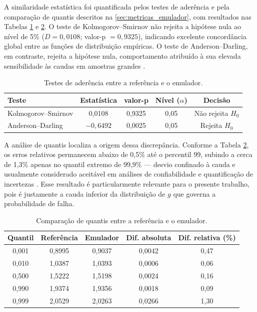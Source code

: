 A similaridade estatística foi quantificada pelos testes de aderência e pela comparação de quantis descritos na \autoref{sec:metricas_emulador}, com resultados nas Tabelas \ref{tab:statistical_tests} e \ref{tab:quantile_comparison}. O teste de Kolmogorov--Smirnov não rejeita a hipótese nula ao nível de 5\% ($D = 0{,}0108$; valor-p $= 0{,}9325$), indicando excelente concordância global entre as funções de distribuição empíricas. O teste de Anderson--Darling, em contraste, rejeita a hipótese nula, comportamento atribuído à sua elevada sensibilidade às caudas em amostras grandes \cite{scholz1987}.

\begin{table}[H]
\centering
\caption{Testes de aderência entre a referência e o emulador.}
\label{tab:statistical_tests}
\begin{tabular}{lcccc}
\toprule
\textbf{Teste} & \textbf{Estatística} & \textbf{valor-p} & \textbf{Nível ($\alpha$)} & \textbf{Decisão} \\
\midrule
Kolmogorov--Smirnov & 0,0108      & 0,9325 & 0,05 & Não rejeita $H_0$ \\
Anderson--Darling   & $-0{,}6492$ & 0,0025 & 0,05 & Rejeita $H_0$ \\
\bottomrule
\end{tabular}
\vspace{0.2cm}
\end{table}

A análise de quantis localiza a origem dessa discrepância. Conforme a Tabela \ref{tab:quantile_comparison}, os erros relativos permanecem abaixo de 0,5\% até o percentil 99, subindo a cerca de 1,3\% apenas no quantil extremo de 99,9\% --- desvio confinado à cauda e usualmente considerado aceitável em análises de confiabilidade e quantificação de incertezas \cite{sudret2008}. Esse resultado é particularmente relevante para o presente trabalho, pois é justamente a cauda inferior da distribuição de $g$ que governa a probabilidade de falha.

\begin{table}[H]
\centering
\caption{Comparação de quantis entre a referência e o emulador.}
\label{tab:quantile_comparison}
\begin{tabular}{ccccc}
\toprule
\textbf{Quantil} & \textbf{Referência} & \textbf{Emulador} & \textbf{Dif. absoluta} & \textbf{Dif. relativa (\%)} \\
\midrule
0,001 & 0,8995 & 0,9037 & 0,0042 & 0,47 \\
0,010 & 1,0387 & 1,0393 & 0,0006 & 0,06 \\
0,500 & 1,5222 & 1,5198 & 0,0024 & 0,16 \\
0,990 & 1,9374 & 1,9356 & 0,0018 & 0,09 \\
0,999 & 2,0529 & 2,0263 & 0,0266 & 1,30 \\
\bottomrule
\end{tabular}
\vspace{0.2cm}
\end{table}

